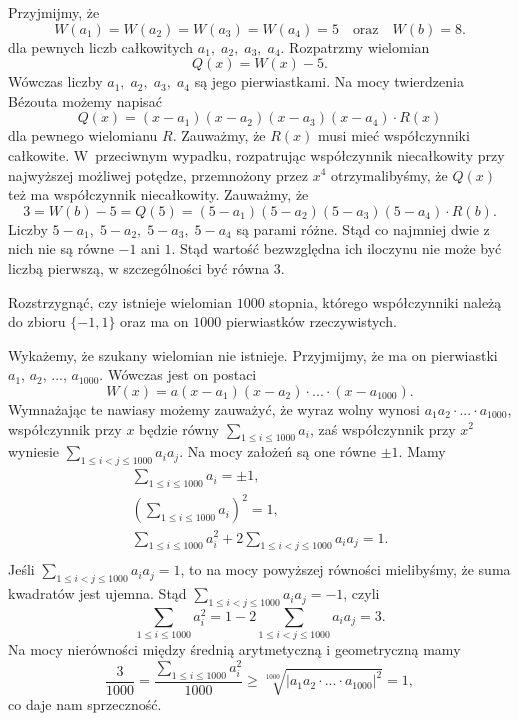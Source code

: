 \noindent
Przyjmijmy, że
\[
    W(a_1) = W(a_2) = W(a_3) = W(a_4) = 5 \quad \text{oraz} \quad W(b) = 8.
\]
dla pewnych liczb całkowitych $a_1, \; a_2, \; a_3, \; a_4$.
Rozpatrzmy wielomian
\[
    Q(x) = W(x) - 5.
\]
Wówczas liczby $a_1, \; a_2, \; a_3, \; a_4$ są jego pierwiastkami. Na mocy twierdzenia Bézouta możemy napisać
\[
    Q(x) = (x - a_1)(x - a_2)(x - a_3)(x - a_4) \cdot R(x)
\]
dla pewnego wielomianu $R$. Zauważmy, że $R(x)$ musi mieć współczynniki całkowite. W~przeciwnym wypadku, rozpatrując współczynnik niecałkowity przy najwyższej możliwej potędze, przemnożony przez $x^4$ otrzymalibyśmy, że $Q(x)$ też ma współczynnik niecałkowity.
Zauważmy, że
\[
    3 = W(b) - 5 = Q(5) = (5 - a_1)(5 - a_2)(5 - a_3)(5 - a_4) \cdot R(b).
\]
Liczby $5 - a_1, \; 5 - a_2, \;5 - a_3, \;5 - a_4$ są parami różne. Stąd co najmniej dwie z nich nie są równe $-1$ ani $1$. Stąd wartość bezwzględna ich iloczynu nie może być liczbą pierwszą, w szczególności być równa $3$.



\begin{problem}{6}
    Rozstrzygnąć, czy istnieje wielomian $1000$ stopnia, którego współczynniki należą do zbioru $\{-1, 1\}$ oraz ma on $1000$ pierwiastków rzeczywistych.
\end{problem}

\noindent
Wykażemy, że szukany wielomian nie istnieje. Przyjmijmy, że ma on pierwiastki $a_1$, $a_2$, ..., $a_{1000}$. Wówczas jest on postaci
\[
    W(x) = a(x - a_1)(x - a_2)\cdot ... \cdot (x - a_{1000}).
\]
Wymnażając te nawiasy możemy zauważyć, że wyraz wolny wynosi $a_1a_2 \cdot ... \cdot a_{1000}$, współczynnik przy $x$ będzie równy $\sum_{1 \leqslant i \leqslant 1000} a_i$, zaś współczynnik przy $x^2$ wyniesie $\sum_{1 \leqslant i < j \leqslant 1000} a_ia_j$. Na mocy założeń są one równe $\pm 1$. Mamy
\begin{align*}
    \sum_{1 \leqslant i \leqslant 1000} a_i = \pm 1, \\
    \left(\sum_{1 \leqslant i \leqslant 1000} a_i\right)^2 = 1, \\
   \sum_{1 \leqslant i \leqslant 1000} a_i^2 + 2\sum_{1 \leqslant i < j \leqslant 1000} a_ia_j = 1. \\
\end{align*}
Jeśli $\sum_{1 \leqslant i < j \leqslant 1000} a_ia_j = 1$, to na mocy powyższej równości mielibyśmy, że suma kwadratów jest ujemna. Stąd $\sum_{1 \leqslant i < j \leqslant 1000} a_ia_j = -1$, czyli
\[
    \sum_{1 \leqslant i \leqslant 1000} a_i^2 = 1 - 2\sum_{1 \leqslant i < j \leqslant 1000} a_ia_j = 3.
\]
Na mocy nierówności między średnią arytmetyczną i geometryczną mamy
\[
   \frac{3}{1000} =  \frac{\sum_{1 \leqslant i \leqslant 1000} a_i^2}{1000} \geqslant \sqrt[1000]{|a_1a_2\cdot ... \cdot a_{1000}|^2} = 1,
\]
co daje nam sprzeczność.

